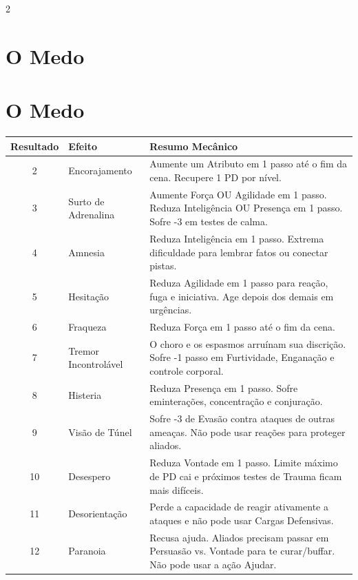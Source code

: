 \documentclass[a4paper,11pt,openany]{book}
\begin{document}
\begin{multicols}{2}

\section{O Medo}

\section{O Medo}

\begin{table}[t]
\centering
\footnotesize
\sffamily
\renewcommand{\arraystretch}{1.3}
\begin{tabularx}{\textwidth}{c l X}
\toprule
\textbf{Resultado} & \textbf{Efeito} & \textbf{Resumo Mecânico} \\
\midrule
2 & Encorajamento & Aumente um Atributo em 1 passo até o fim da cena. Recupere 1 PD por nível. \\
3 & Surto de Adrenalina & Aumente Força OU Agilidade em 1 passo. Reduza Inteligência OU Presença em 1 passo. Sofre -3 em testes de calma. \\
4 & Amnesia & Reduza Inteligência em 1 passo. Extrema dificuldade para lembrar fatos ou conectar pistas. \\
5 & Hesitação & Reduza Agilidade em 1 passo para reação, fuga e iniciativa. Age depois dos demais em urgências. \\
6 & Fraqueza & Reduza Força em 1 passo até o fim da cena. \\
7 & Tremor Incontrolável & O choro e os espasmos arruínam sua discrição. Sofre -1 passo em Furtividade, Enganação e controle corporal. \\
8 & Histeria & Reduza Presença em 1 passo. Sofre eminterações, concentração e conjuração. \\
9 & Visão de Túnel & Sofre -3 de Evasão contra ataques de outras ameaças. Não pode usar reações para proteger aliados. \\
10 & Desespero & Reduza Vontade em 1 passo. Limite máximo de PD cai e próximos testes de Trauma ficam mais difíceis. \\
11 & Desorientação & Perde a capacidade de reagir ativamente a ataques e não pode usar Cargas Defensivas. \\
12 & Paranoia & Recusa ajuda. Aliados precisam passar em Persuasão vs. Vontade para te curar/buffar. Não pode usar a ação Ajudar. \\

\end{tabularx}
\end{table}
\end{multicols}
\end{document}
